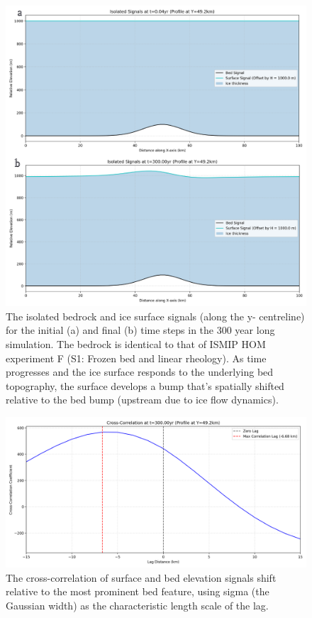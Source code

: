 \begin{figure}[H]
    \includegraphics[scale=0.30]{S1_F_signals.pdf}
    \caption{The isolated bedrock and ice surface signals (along the y- centreline) for the initial (a) and final (b) time steps in the 300 year long simulation. The bedrock is identical to that of ISMIP HOM experiment F (S1: Frozen bed and linear rheology). As time progresses and the ice surface responds to the underlying bed topography, the surface develops a bump that's spatially shifted relative to the bed bump (upstream due to ice flow dynamics).}
    \label{fig:phase_analysis_Signals}
\end{figure}
\begin{figure}[H]
    \includegraphics[scale=0.30]{S1_F_correlation_t_0036.png}
    \caption{The cross-correlation of surface and bed elevation signals shift relative to the most prominent bed feature, using sigma (the Gaussian width) as the characteristic length scale of the lag.}
    \label{fig:phase_analysis_Cross_Correlation}
\end{figure}
